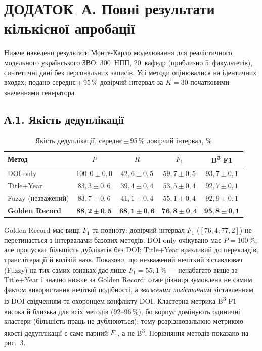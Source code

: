 \section*{ДОДАТОК~А. Повні результати кількісної апробації}

Нижче наведено результати Монте-Карло моделювання для реалістичного модельного українського ЗВО: 300~НПП, 20~кафедр (приблизно 5~факультетів), синтетичні дані без персональних записів. Усі методи оцінювалися на ідентичних входах; подано середнє\,$\pm$\,95\,\% довірчий інтервал за $K=30$ початковими значеннями генератора.

\subsection*{А.1. Якість дедуплікації}

\begin{table}[ht]
\centering
\caption{Якість дедуплікації, середнє\,$\pm$\,95\,\% довірчий інтервал, \%}
\label{tab:res-dedup}
\begin{tabular}{lcccc}
\toprule
Метод & $P$ & $R$ & $F_1$ & B\textsuperscript{3} F1 \\
\midrule
DOI-only        & $100{,}0 \pm 0{,}0$ & $42{,}6 \pm 0{,}5$ & $59{,}7 \pm 0{,}5$ & $93{,}7 \pm 0{,}1$ \\
Title+Year      & $83{,}3 \pm 0{,}6$  & $39{,}4 \pm 0{,}4$ & $53{,}5 \pm 0{,}4$ & $92{,}7 \pm 0{,}1$ \\
Fuzzy (незважений) & $83{,}7 \pm 0{,}6$ & $41{,}1 \pm 0{,}4$ & $55{,}1 \pm 0{,}4$ & $92{,}9 \pm 0{,}1$ \\
\textbf{Golden Record} & $\mathbf{88{,}2 \pm 0{,}5}$ & $\mathbf{68{,}1 \pm 0{,}6}$ & $\mathbf{76{,}8 \pm 0{,}4}$ & $\mathbf{95{,}8 \pm 0{,}1}$ \\
\bottomrule
\end{tabular}
\end{table}

Golden Record має вищі $F_1$ та повноту: довірчий інтервал $F_1$ ($[76{,}4; 77{,}2]$) не перетинається з інтервалами базових методів. DOI-only очікувано має $P=100\,\%$, але пропускає більшість дублікатів без DOI; Title+Year вразливий до перекладів, транслітерації й колізій назв. Показово, що незважений нечіткий зіставлювач (Fuzzy) на тих самих ознаках дає лише $F_1 = 55{,}1\,\%$ --- ненабагато вище за Title+Year і значно нижче за Golden Record: отже різниця зумовлена не самим фактом використання нечіткої подібності, а \textit{зваженим логістичним} зіставленням із DOI-свідченням та охоронцем конфлікту DOI. Кластерна метрика B\textsuperscript{3} F1 висока й близька для всіх методів (92--96\,\%), бо корпус домінують одиничні кластери (більшість праць не дублюються); тому розрізнювальною метрикою якості дедуплікації є саме парний $F_1$, а не B\textsuperscript{3}. Порівняння методів показано на рис.~3.

